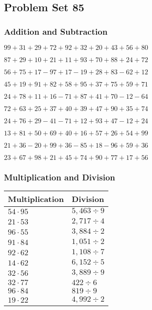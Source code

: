 \hypertarget{problem-set-85}{%
\subsection{Problem Set 85}\label{problem-set-85}}

\hypertarget{addition-and-subtraction}{%
\subsubsection{Addition and
Subtraction}\label{addition-and-subtraction}}

\(99+31+29+72+92+32+20+43+56+80\)

\(87+29+10+21+11+93+70+88+24+72\)

\(56+75+17-97+17-19+28+83-62+12\)

\(45+19+91+82+58+95+37+75+59+71\)

\(24+78+11+16-71+87+41+70-12-64\)

\(72+63+25+37+40+39+47+90+35+74\)

\(24+76+29-41-71+12+93+47-12+24\)

\(13+81+50+69+40+16+57+26+54+99\)

\(21+36-20+99+36-85+18-96+59+36\)

\(23+67+98+21+45+74+90+77+17+56\)

\hypertarget{multiplication-and-division}{%
\subsubsection{Multiplication and
Division}\label{multiplication-and-division}}

\begin{longtable}[]{@{}ll@{}}
\toprule
Multiplication & Division\tabularnewline
\midrule
\endhead
\(54\cdot95\) & \(5,463÷9\)\tabularnewline
\(21\cdot53\) & \(2,717÷4\)\tabularnewline
\(96\cdot55\) & \(3,884÷2\)\tabularnewline
\(91\cdot84\) & \(1,051÷2\)\tabularnewline
\(92\cdot62\) & \(1,108÷7\)\tabularnewline
\(14\cdot62\) & \(6,152÷5\)\tabularnewline
\(32\cdot56\) & \(3,889÷9\)\tabularnewline
\(32\cdot77\) & \(422÷6\)\tabularnewline
\(96\cdot84\) & \(819÷9\)\tabularnewline
\(19\cdot22\) & \(4,992÷2\)\tabularnewline
\bottomrule
\end{longtable}
